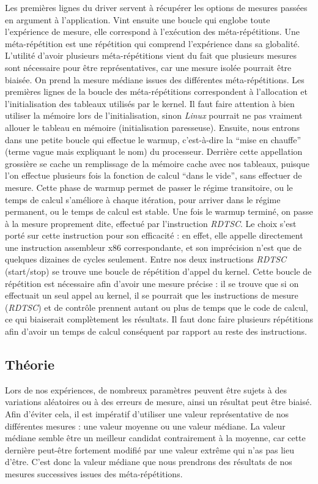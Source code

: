 \documentclass[12pt,a4paper]{article}
\begin{document}
Les premières lignes du driver servent à récupérer les options de mesures
passées en argument à l'application. Vint ensuite une boucle qui englobe toute
l'expérience de mesure, elle correspond à l’exécution des méta-répétitions. Une
méta-répétition est une répétition qui comprend l'expérience dans sa globalité.
L'utilité d'avoir plusieurs méta-répétitions vient du fait que plusieurs mesures
sont nécessaire pour être représentatives, car une mesure isolée pourrait être
biaisée. On prend la mesure médiane issues des différentes méta-répétitions. Les
premières lignes de la boucle des méta-répétitions correspondent à l'allocation
et l'initialisation des tableaux utilisés par le kernel. Il faut faire attention
à bien utiliser la mémoire lors de l'initialisation, sinon \textit{Linux}
pourrait ne pas vraiment allouer le tableau en mémoire (initialisation
paresseuse). Ensuite, nous entrons dans une petite boucle qui effectue le
warmup, c'est-à-dire la \enquote{mise en chauffe} (terme vague mais expliquant
le nom) du processeur. Derrière cette appellation grossière se cache un
remplissage de la mémoire cache avec nos tableaux, puisque l'on effectue
plusieurs fois la fonction de calcul \enquote{dans le vide}, sans effectuer de
mesure. Cette phase de warmup permet de passer le régime transitoire, ou le
temps de calcul s'améliore à chaque itération, pour arriver dans le régime
permanent, ou le temps de calcul est stable. Une fois le warmup terminé, on
passe à la mesure proprement dite, effectué par l'instruction \textit{RDTSC}. Le
choix s'est porté sur cette instruction pour son efficacité : en effet, elle
appelle directement une instruction assembleur x86 correspondante, et son
imprécision n'est que de quelques dizaines de cycles seulement. Entre nos deux
instructions \textit{RDTSC} (start/stop) se trouve une boucle de répétition
d'appel du kernel. Cette boucle de répétition est nécessaire afin d'avoir une
mesure précise : il se trouve que si on effectuait un seul appel au kernel, il
se pourrait que les instructions de mesure (\textit{RDTSC}) et de contrôle
prennent autant ou plus de temps que le code de calcul, ce qui biaiserait
complètement les résultats. Il faut donc faire plusieurs répétitions afin
d'avoir un temps de calcul conséquent par rapport au reste des instructions.

\subsection{Théorie}

Lors de nos expériences, de nombreux paramètres peuvent être sujets à des
variations aléatoires ou à des erreurs de mesure, ainsi un résultat peut être
biaisé. Afin d'éviter cela, il est impératif d'utiliser une valeur
représentative de nos différentes mesures : une valeur moyenne ou une valeur
médiane. La valeur médiane semble être un meilleur candidat contrairement à la
moyenne, car cette dernière peut-être fortement modifié par une valeur extrême
qui n'as pas lieu d'être. C'est donc la valeur médiane que nous prendrons des
résultats de nos mesures successives issues des méta-répétitions.
\end{document}

